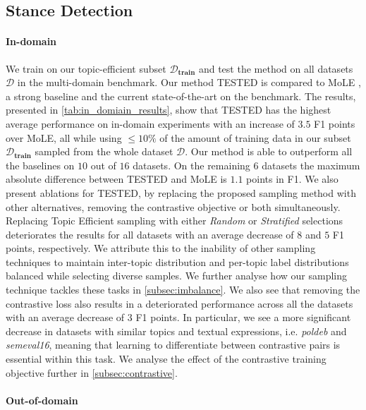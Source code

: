 \documentclass[11pt]{article}
\begin{document}
\subsection{Stance Detection}

\paragraph{In-domain}

We train on our topic-efficient subset $\mathcal{D}_\textbf{train}$ and test the method on all datasets $\mathcal{D}$ in the multi-domain benchmark. Our method TESTED is compared to MoLE \citep{hardalov2021cross}, a strong baseline and the current state-of-the-art on the benchmark. The results, presented in \autoref{tab:in_domiain_results}, show that TESTED has the highest average performance on in-domain experiments with an increase of $3.5$ F1 points over MoLE, all while using $\leq10\%$ of the amount of training data in our subset $\mathcal{D}_\textbf{train}$ sampled from the whole dataset $\mathcal{D}$. Our method is able to outperform all the baselines on $10$ out of $16$ datasets. On the remaining $6$ datasets the maximum absolute difference between TESTED and MoLE is $1.1$ points in F1. We also present ablations for TESTED, by replacing the proposed sampling method with other alternatives, removing the contrastive objective or both simultaneously. Replacing Topic Efficient sampling with either \emph{Random} or \emph{Stratified} selections deteriorates the results for all datasets with an average decrease of $8$ and $5$ F1 points, respectively. We attribute this to the inability of other sampling techniques to maintain inter-topic distribution and per-topic label distributions balanced while selecting diverse samples. We further analyse how our sampling technique tackles these tasks in \autoref{subsec:imbalance}. We also see that removing the contrastive loss also results in a deteriorated performance across all the datasets with an average decrease of $3$ F1 points. In particular, we see a more significant decrease in datasets with similar topics and textual expressions, i.e. \emph{poldeb} and \emph{semeval16}, meaning that learning to differentiate between contrastive pairs is essential within this task. We analyse the effect of the contrastive training objective further in \autoref{subsec:contrastive}.




\paragraph{Out-of-domain}
\end{document}
